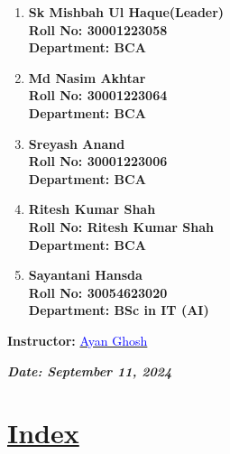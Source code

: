 \documentclass[a4paper,12pt]{article}
\begin{document}
\begin{titlepage}
    \normalsize
    \begin{enumerate}
        \item \textbf{Sk Mishbah Ul Haque(Leader)}\\
              \textbf{Roll No: 30001223058}\\
              \textbf{Department: BCA}
        \item \textbf{Md Nasim Akhtar}\\
              \textbf{Roll No: 30001223064}\\
              \textbf{Department: BCA}
        \item \textbf{Sreyash Anand}\\
              \textbf{Roll No: 30001223006}\\
              \textbf{Department: BCA}
        \item \textbf{Ritesh Kumar Shah}\\
              \textbf{Roll No: Ritesh Kumar Shah}\\
              \textbf{Department: BCA}
        \item \textbf{Sayantani Hansda}\\
              \textbf{Roll No: 30054623020}\\
              \textbf{Department: BSc in IT (AI)}
    \end{enumerate}
    \vspace{0.8 cm}
    
    \textbf{Instructor:} \href{mailto:ayan.ghosh@university.edu}{\textcolor{blue}{Ayan Ghosh}}\\
    \vspace{0.2cm}
    
    \textbf{\textit{Date: September 11, 2024}}

\end{titlepage}
\newpage
{}
\vspace{-2cm}

\centering
\section*{\underline{\Huge\textbf{\textcolor{blue!60}{Index}}}}
\vspace{0.5cm}
\end{document}
